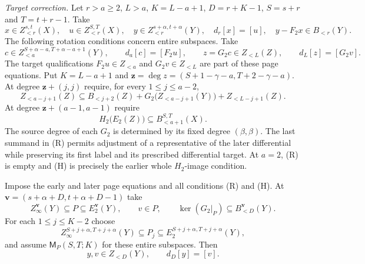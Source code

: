 \begin{corollary}
\label{sem:ProofTools:coverage-higher-early-boundary-corrections}

\textit{Target correction.}
Let $r>a\ge2$, $L>a$, $K=L-a+1$, $D=r+K-1$,
$S=s+r$ and $T=t+r-1$. Take
\[
x\in Z_{<r}^{s,t}(X),\quad u\in Z_{<r}^{S,T}(X),\quad
 y\in Z_{<r}^{s+\alpha,t+\alpha}(Y),\quad
 d_r[x]=[u],\quad y-F_2x\in B_{<r}(Y).
\]
The following rotation conditions concern entire subspaces. Take
\[
c\in Z_{<a}^{S+\alpha-a,T+\alpha-a+1}(Y),\qquad
 d_a[c]=[F_2u],\qquad z=G_2c\in Z_{<L}(Z),\qquad
 d_L[z]=[G_2v].
\]
The target qualifications $F_2u\in Z_{<a}$ and
$G_2v\in Z_{<L}$ are part of these page equations.
Put $K=L-a+1$ and $\mathbf z=\deg z=(S+1-\gamma-a,T+2-\gamma-a)$.
At degree $\mathbf z+(j,j)$ require, for every $1\le j\le a-2$,
\[
 Z_{<a-j+1}(Z)\subseteq B_{<j+2}(Z)
   +G_2\bigl(Z_{<a-j+1}(Y)\bigr)+Z_{<L-j+1}(Z).
\tag{R}
\]
At degree $\mathbf z+(a-1,a-1)$ require
\[
 H_2\bigl(E_2(Z)\bigr)\subseteq B_{<a+1}^{S,T}(X).
\tag{H}
\]
The source degree of each $G_2$ is determined by its fixed degree
$(\beta,\beta)$. The last summand in (R) permits adjustment of a
representative of the later differential while preserving its first label and
its prescribed differential target. At $a=2$, (R) is empty and (H)
is precisely the earlier whole $H_2$-image condition.

Impose the early and later page equations and all conditions (R) and (H). At
$\mathbf v=(s+\alpha+D,t+\alpha+D-1)$ take
\[
 Z_\infty^{\mathbf v}(Y)\subseteq P\subseteq E_2^{\mathbf v}(Y),
 \qquad v\in P,\qquad \ker(G_2|_P)\subseteq B_{<D}^{\mathbf v}(Y).
\]
For each $1\le j\le K-2$ choose
\[
Z_\infty^{S+j+\alpha,T+j+\alpha}(Y)\subseteq P_j
 \subseteq E_2^{S+j+\alpha,T+j+\alpha}(Y),
\]
and assume $\mathsf M_P(S,T;K)$ for these entire subspaces. Then
\[
y,v\in Z_{<D}(Y),\qquad d_D[y]=[v].
\]


\end{corollary}
